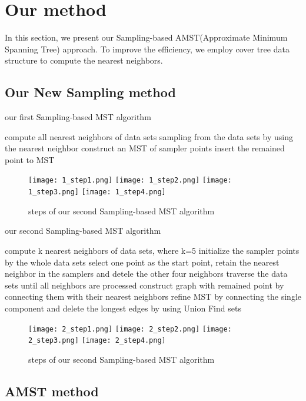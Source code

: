 \section{Our method} 
	In this section, we present our Sampling-based AMST(Approximate Minimum Spanning Tree) approach. To improve the efficiency, we employ cover tree data structure to compute the nearest neighbors.
	\subsection{Our New Sampling method}
		\begin{algorithm}
		  \caption{our first Sampling-based MST algorithm}  
			 compute all nearest neighbors of data sets\;
			 sampling from the data sets by using the nearest neighbor\;
			 construct an MST of sampler points\;
			 insert the remained point to MST\;
		\end{algorithm}

		\begin{figure}[!t]
	        \centering
	        \texttt{[image: 1\_step1.png]}
	        \texttt{[image: 1\_step2.png]}
	        \texttt{[image: 1\_step3.png]}
	        \texttt{[image: 1\_step4.png]}
	        \caption{steps of our second Sampling-based MST algorithm}
	    \end{figure}

		\begin{algorithm}
		  \caption{our second Sampling-based MST algorithm}  
			\KwIn{a set of N data points}
			\KwOut{an MST}
			 compute k nearest neighbors of data sets, where k=5\;
			 initialize the sampler points by the whole data sets\;
			 select one point as the start point, retain the nearest neighbor in the samplers and detele the other four neighbors\;
			 traverse the data sets until all neighbors are processed\;
			 construct graph with remained point by connecting them with their nearest neighbors\;
			 refine MST by connecting the single component and delete the longest edges by using Union Find sets\;
		\end{algorithm}
	
		\begin{figure}[!t]
	        \centering
	        \texttt{[image: 2\_step1.png]}\vspace{4pt}
	        \texttt{[image: 2\_step2.png]}\vspace{4pt}
	        \texttt{[image: 2\_step3.png]}\vspace{4pt}
	        \texttt{[image: 2\_step4.png]}
	        \caption{steps of our second Sampling-based MST algorithm}
	    \end{figure}
		
	\subsection{AMST method}
